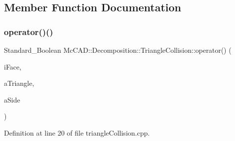 \subsection{Member Function Documentation}
\mbox{\label{classMcCAD_1_1Decomposition_1_1TriangleCollision_af452f50ec7e08c8bc01d7f81f543ce9f}} 
\subsubsection{\texorpdfstring{operator()()}{operator()()}\hspace{0.1cm}{\footnotesize\ttfamily [1/2]}}
{\footnotesize\ttfamily Standard\+\_\+\+Boolean Mc\+C\+A\+D\+::\+Decomposition\+::\+Triangle\+Collision\+::operator() (\begin{DoxyParamCaption}\item[{const \hyperlink{classMcCAD_1_1Geometry_1_1BoundSurface}{Mc\+C\+A\+D\+::\+Geometry\+::\+Bound\+Surface} \&}]{i\+Face,  }\item[{const \hyperlink{classMcCAD_1_1Geometry_1_1MeshTriangle}{Mc\+C\+A\+D\+::\+Geometry\+::\+Mesh\+Triangle} \&}]{a\+Triangle,  }\item[{Standard\+\_\+\+Integer \&}]{a\+Side }\end{DoxyParamCaption})}



Definition at line 20 of file triangle\+Collision.\+cpp.


